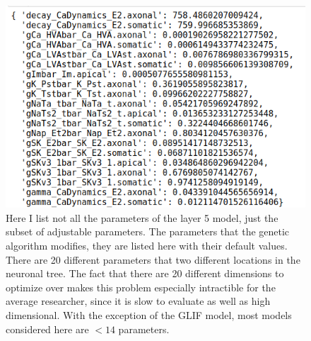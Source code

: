 \begin{figure}
    \begin{center}
    \includegraphics{figures/parameters_opt_l5pc.png}
    \caption[Subset of modal parameters eligible for tuning in L5PC neuron]{Here I list not all the parameters of the layer 5 model, just the subset of adjustable parameters. The parameters that the genetic algorithm modifies, they are listed here with their default values. There are 20 different parameters that two different locations in the neuronal tree. The fact that there are 20 different dimensions to optimize over makes this problem especially intractible for the average researcher, since it is slow to evaluate as well as high dimensional. With the exception of the GLIF model, most models considered here are $<14$ parameters.}
    \label{fig:ca1_parameters}
    \end{center}
\end{figure}




